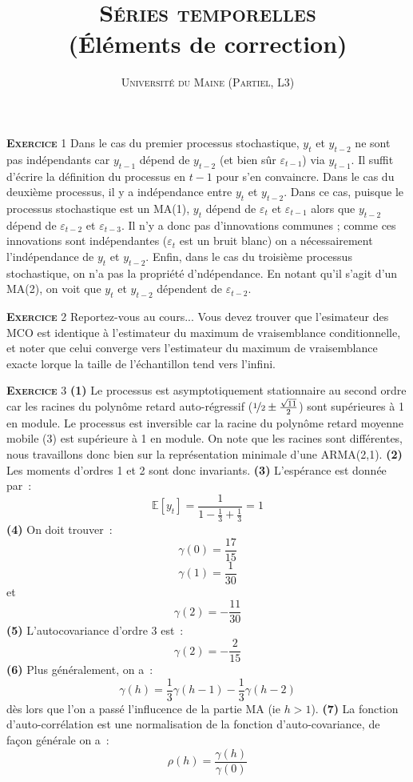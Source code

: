 \documentclass[12pt,a4paper,notitlepage]{article}
\newcommand{\exercice}[1]{\textsc{\textbf{Exercice}} #1}
\begin{document}
\title{\textsc{Séries temporelles}\\(Éléments de correction)}
\author{\textsc{Université du Maine (Partiel, L3)}}
\date{}


\maketitle

\exercice{1} Dans le cas du premier processus stochastique, $y_{t}$ et
$y_{t-2}$ ne sont pas indépendants car $y_{t-1}$ dépend de $y_{t-2}$
(et bien sûr $\varepsilon_{t-1}$) via $y_{t-1}$. Il suffit d'écrire la
définition du processus en $t-1$ pour s'en convaincre. Dans le cas du
deuxième processus, il y a indépendance entre $y_{t}$ et
$y_{t-2}$. Dans ce cas, puisque le processus stochastique est un
MA(1), $y_{t}$ dépend de $\varepsilon_{t}$ et $\varepsilon_{t-1}$
alors que $y_{t-2}$ dépend de $\varepsilon_{t-2}$ et
$\varepsilon_{t-3}$. Il n'y a donc pas d'innovations communes ; comme
ces innovations sont indépendantes (${\varepsilon_{t}}$ est un bruit
blanc) on a nécessairement l'indépendance de $y_{t}$ et
$y_{t-2}$. Enfin, dans le cas du troisième processus stochastique, on
n'a pas la propriété d'ndépendance. En notant qu'il s'agit d'un MA(2),
on voit que $y_{t}$ et $y_{t-2}$ dépendent de $\varepsilon_{t-2}$.\newline

\bigskip

\exercice{2} Reportez-vous au cours... Vous devez trouver que
l'esimateur des MCO est identique à l'estimateur du maximum de
vraisemblance conditionnelle, et noter que celui converge vers
l'estimateur du maximum de vraisemblance exacte lorque la taille de
l'échantillon tend vers l'infini.\newline

\bigskip

\exercice{3} \textbf{(1)} Le processus est asymptotiquement
stationnaire au second ordre car les racines du polynôme retard
auto-régressif ($
\nicefrac{1}{2}\pm\frac{\sqrt{11}}{2}$) sont supérieures à 1 en module. Le processus est
inversible car la racine du polynôme retard moyenne mobile (3) est
supérieure à 1 en module. On note que les racines sont différentes,
nous travaillons donc bien sur la représentation minimale d'une
ARMA(2,1). \textbf{(2)} Les moments d'ordres 1 et 2 sont donc
invariants. \textbf{(3)} L'espérance est donnée par :
\[
\mathbb E [y_t] = \frac{1}{1-\frac{1}{3}+\frac{1}{3}} = 1 
\]
\textbf{(4)} On doit trouver :
\[
\gamma(0) = \frac{17}{15} 
\]
\[
\gamma(1) = \frac{1}{30}
\]
et
\[
\gamma(2) = -\frac{11}{30}
\]
\textbf{(5)} L'autocovariance d'ordre 3 est :
\[
\gamma(2) = -\frac{2}{15}
\]
\textbf{(6)} Plus généralement, on a :
\[
\gamma(h) = \frac{1}{3}\gamma(h-1)-\frac{1}{3}\gamma(h-2)
\]
dès lors que l'on a passé l'influcence de la partie MA (ie $h>1$).
\textbf{(7)} La fonction d'auto-corrélation est une normalisation de la fonction d'auto-covariance, de façon générale on a :
\[
\rho(h) = \frac{\gamma(h)}{\gamma(0)}
\]
\end{document}
